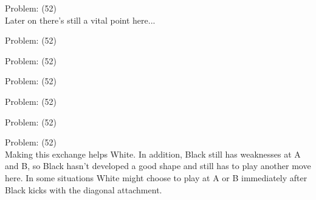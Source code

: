 \documentclass[11pt]{article}
\begin{document}
\begin{minipage}[t]{0.5\textwidth}
  {\centering
  
  Problem: (52)\\
  Later on there's still a vital point here...\\
  }
\end{minipage}
\begin{minipage}[t]{0.5\textwidth}
  {\centering
  
  Problem: (52)\\
  
  }
\end{minipage}
\begin{minipage}[t]{0.5\textwidth}
  {\centering
  
  Problem: (52)\\
  
  }
\end{minipage}
\begin{minipage}[t]{0.5\textwidth}
  {\centering
  
  Problem: (52)\\
  
  }
\end{minipage}
\begin{minipage}[t]{0.5\textwidth}
  {\centering
  
  Problem: (52)\\
  
  }
\end{minipage}
\begin{minipage}[t]{0.5\textwidth}
  {\centering
  
  Problem: (52)\\
  
  }
\end{minipage}
\begin{minipage}[t]{0.5\textwidth}
  {\centering
  
  Problem: (52)\\
  Making this exchange helps White. In addition, Black still has weaknesses at A and B, so Black hasn't developed a good shape and still has to play another move here. In some situations White might choose to play at A or B immediately after Black kicks with the diagonal attachment.\\
  }
\end{minipage}
\end{document}
